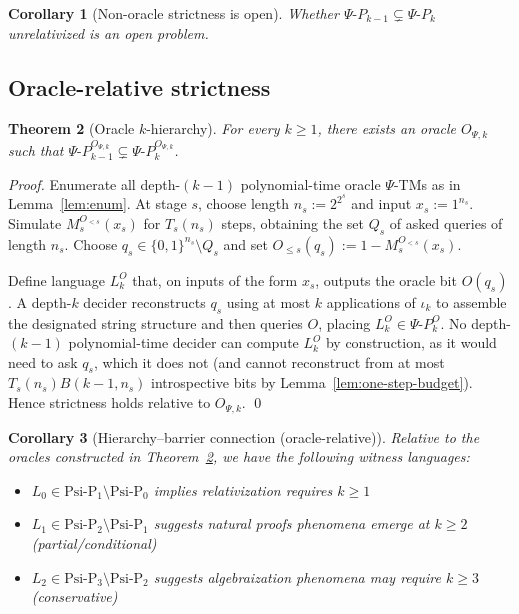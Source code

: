 \documentclass[11pt]{article}
\newtheorem{theorem}{Theorem}[section]
\newtheorem{corollary}[theorem]{Corollary}
\theoremstyle{definition}
\newcommand{\PSi}{\Psi}
\newcommand{\bits}{\{0,1\}}
\begin{document}
\begin{corollary}[Non-oracle strictness is open]
\label{cor:strictness-open}
Whether $\Psi\text{-}P_{k-1}\subsetneq \Psi\text{-}P_k$ unrelativized is an open problem.
\end{corollary}

\subsection{Oracle-relative strictness}

\begin{theorem}[Oracle $k$-hierarchy]
\label{thm:oracle-k-hierarchy}
For every $k\ge1$, there exists an oracle $O_{\PSi,k}$ such that $\Psi\text{-}P_{k-1}^{O_{\PSi,k}} \subsetneq \Psi\text{-}P_{k}^{O_{\PSi,k}}$.
\end{theorem}
\begin{proof}
Enumerate all depth-$(k{-}1)$ polynomial-time oracle $\PSi$-TMs as in Lemma~\ref{lem:enum}. At stage $s$, choose length $n_s:=2^{2^s}$ and input $x_s:=1^{n_s}$. Simulate $M_s^{O_{<s}}(x_s)$ for $T_s(n_s)$ steps, obtaining the set $Q_s$ of asked queries of length $n_s$. Choose $q_s\in\bits^{n_s}\setminus Q_s$ and set $O_{\le s}(q_s):=1-M_s^{O_{<s}}(x_s)$.

Define language $L_k^{O}$ that, on inputs of the form $x_s$, outputs the oracle bit $O(q_s)$. A depth-$k$ decider reconstructs $q_s$ using at most $k$ applications of $\iota_k$ to assemble the designated string structure and then queries $O$, placing $L_k^{O}\in\Psi\text{-}P_{k}^{O}$. No depth-$(k{-}1)$ polynomial-time decider can compute $L_k^{O}$ by construction, as it would need to ask $q_s$, which it does not (and cannot reconstruct from at most $T_s(n_s) B(k{-}1,n_s)$ introspective bits by Lemma~\ref{lem:one-step-budget}). Hence strictness holds relative to $O_{\PSi,k}$. \qed
\end{proof}

\begin{corollary}[Hierarchy--barrier connection (oracle-relative)]
Relative to the oracles constructed in Theorem~\ref{thm:oracle-k-hierarchy}, we have the following witness languages:
\begin{itemize}
    \item $L_0 \in \text{Psi-P}_1 \setminus \text{Psi-P}_0$ 
          implies relativization requires $k \geq 1$
    \item $L_1 \in \text{Psi-P}_2 \setminus \text{Psi-P}_1$ 
          suggests natural proofs phenomena emerge at $k \geq 2$ (partial/conditional)  
    \item $L_2 \in \text{Psi-P}_3 \setminus \text{Psi-P}_2$ 
          suggests algebraization phenomena may require $k \geq 3$ (conservative)
\end{itemize}
\end{corollary}
\end{document}
